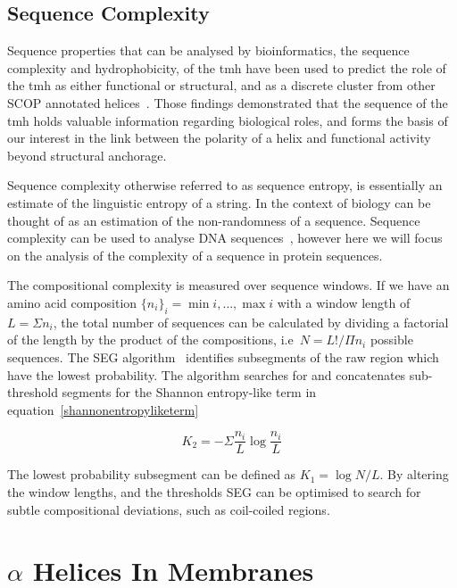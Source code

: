 \subsection{Sequence Complexity}

Sequence properties that can be analysed by bioinformatics, the sequence complexity and hydrophobicity, of the \gls{tmh} have been used to predict the role of the \gls{tmh} as either functional or structural, and as a discrete cluster from other SCOP annotated helices~\cite{Wong2012}. Those findings demonstrated that the sequence of the \gls{tmh} holds valuable information regarding biological roles, and forms the basis of our interest in the link between the polarity of a helix and functional activity beyond structural anchorage.

Sequence complexity otherwise referred to as sequence entropy, is essentially an estimate of the linguistic entropy of a string. In the context of biology can be thought of as an estimation of the non-randomness of a sequence. Sequence complexity can be used to analyse DNA sequences~\cite{Pinho2013, Oliver1993, Troyanskaya2002}, however here we will focus on the analysis of the complexity of a sequence in protein sequences.

The compositional complexity is measured over sequence windows. If we have an amino acid composition $\{{{n}_{i}}{\}}_{i}={\min{i}},\ldots,{\max{i}}$ with a window length of $L=\Sigma {n}_i $, the total number of sequences can be calculated by dividing a factorial of the length by the product of the compositions, i.e\  $ N = L!/\Pi{n}_i $ possible sequences. The SEG algorithm~\cite{WOOTTON1994269, Wootton1996} identifies subsegments of the raw region which have the lowest probability. The algorithm searches for and concatenates sub-threshold segments for the Shannon entropy-like term in equation~\ref{shannonentropyliketerm}

\begin{equation} \label{shannonentropyliketerm}
{K}_{2}=-\Sigma\frac{n_i}{L}\log\frac{n_i}{L}
\end{equation}

The lowest probability subsegment can be defined as $ K_1=\log N/L $. By altering the window lengths, and the thresholds SEG can be optimised to search for subtle compositional deviations, such as coil-coiled regions.

\section{$\alpha$ Helices In Membranes }

